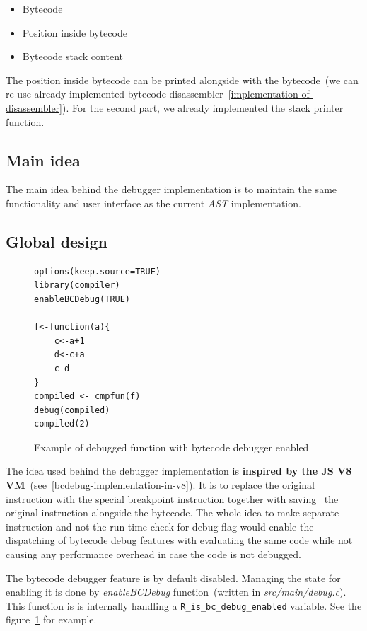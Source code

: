 \documentclass[thesis=M,english]{FITthesis}[2018/10/20]
\newcommand{\code}[1]{\texttt{#1}}
\begin{document}
\begin{itemize}
	\item Bytecode
	\item Position inside bytecode
	\item Bytecode stack content
\end{itemize}

The position inside bytecode can be printed alongside with the bytecode~(we can re-use already implemented bytecode disassembler~\ref{implementation-of-disassembler}). For the second part, we already implemented the stack printer function.

\subsection{Main idea}

The main idea behind the debugger implementation is to maintain the same functionality and user interface as the current \textit{AST} implementation.

\subsection{Global design}

\begin{figure}[h]
\begin{lstlisting}
options(keep.source=TRUE)
library(compiler)
enableBCDebug(TRUE)

f<-function(a){
    c<-a+1
    d<-c+a
    c-d
}
compiled <- cmpfun(f)
debug(compiled)
compiled(2)
\end{lstlisting}
	\caption{Example of debugged function with bytecode debugger enabled}\label{fig:debugged-bcdebug-enabled}
\end{figure}

The idea used behind the debugger implementation is \textbf{inspired by the JS V8 VM}~(see~\ref{bcdebug-implementation-in-v8}). It is to replace the original instruction with the special breakpoint instruction together with saving~ the original instruction alongside the bytecode. The whole idea to make separate instruction and not the run-time check for debug flag would enable the dispatching of bytecode debug features with evaluating the same code while not causing any performance overhead in case the code is not debugged.

The bytecode debugger feature is by default disabled. Managing the state for enabling it is done by \textit{enableBCDebug} function~(written in \textit{src/main/debug.c}). This function is is internally handling a \code{R{\_}is{\_}bc{\_}debug{\_}enabled} variable. See the figure~\ref{fig:debugged-bcdebug-enabled} for example.
\end{document}
